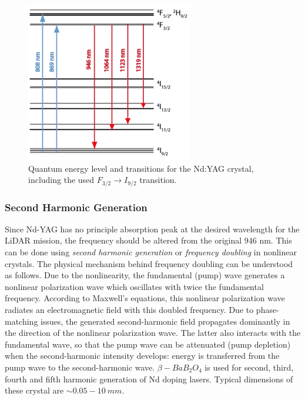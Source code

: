 \begin{figure} [ht]
\centering
\includegraphics[scale=1.2]{chapters/img/laser_line.png}	
\caption{Quantum energy level and transitions for the Nd:YAG crystal, including the used $F_{3/2}\rightarrow I_{9/2}$ transition.}
\label{laser}
\end{figure}

\subsubsection{Second Harmonic Generation}
\label{SHG}
Since Nd-YAG has no principle absorption peak at the desired wavelength for the \acs{LiDAR} mission, the frequency should be altered from the original 946 nm. This can be done using \textit{second harmonic generation} or \textit{frequency doubling} in nonlinear crystals.
The physical mechanism behind frequency doubling can be understood as follows. Due to the nonlinearity, the fundamental (pump) wave generates a nonlinear polarization wave which oscillates with twice the fundamental frequency. According to Maxwell's equations, this nonlinear polarization wave radiates an electromagnetic field with this doubled frequency. Due to phase-matching issues, the generated second-harmonic field propagates dominantly in the direction of the nonlinear polarization wave. The latter also interacts with the fundamental wave, so that the pump wave can be attenuated (pump depletion) when the second-harmonic intensity develops: energy is transferred from the pump wave to the second-harmonic wave.
$\beta-BaB_{2}O_{4}$ is used for second, third, fourth and fifth harmonic generation of Nd doping \acp{laser}. Typical dimensions of these crystal are $\sim0.05 - 10\ mm$.

